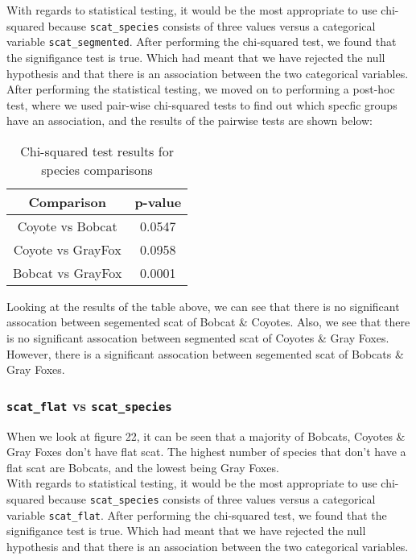 \documentclass[a4paper]{article}
\begin{document}
\noindent With regards to statistical testing, it would be the most appropriate to use chi-squared because \texttt{scat\_species} consists of three values
versus a categorical variable \texttt{scat\_segmented}. After performing the chi-squared test, we found that the signifigance test is true. Which had meant 
that we have rejected the null hypothesis and that there is an association between the two categorical variables. \\

\noindent After performing the statistical testing, we moved on to performing a post-hoc test, where we used pair-wise chi-squared tests to find out which
specfic groups have an association, and the results of the pairwise tests are shown below: \\

\begin{table}[h!]
    \centering
    \begin{tabular}{|c|c|}
        \hline
        Comparison & p-value \\
        \hline
        Coyote vs Bobcat & 0.0547 \\
        Coyote vs GrayFox & 0.0958 \\
        Bobcat vs GrayFox & 0.0001 \\
        \hline
    \end{tabular}
    \caption{Chi-squared test results for species comparisons}
    \label{tab:chi_squared_results}
\end{table}

\noindent Looking at the results of the table above, we can see that there is no significant assocation between segemented scat of Bobcat \& Coyotes. Also, 
we see that there is no significant assocation between segmented scat of Coyotes \& Gray Foxes. However, there is a significant assocation between segemented
scat of Bobcats \& Gray Foxes. 

\subsubsection{\texttt{scat\_flat} vs \texttt{scat\_species}}
When we look at figure 22, it can be seen that a majority of Bobcats, Coyotes \& Gray Foxes don't have flat scat. The highest number of species that don't
have a flat scat are Bobcats, and the lowest being Gray Foxes. \\

\noindent With regards to statistical testing, it would be the most appropriate to use chi-squared because \texttt{scat\_species} consists of three values
versus a categorical variable \texttt{scat\_flat}. After performing the chi-squared test, we found that the signifigance test is true. Which had meant 
that we have rejected the null hypothesis and that there is an association between the two categorical variables. \\
\end{document}
